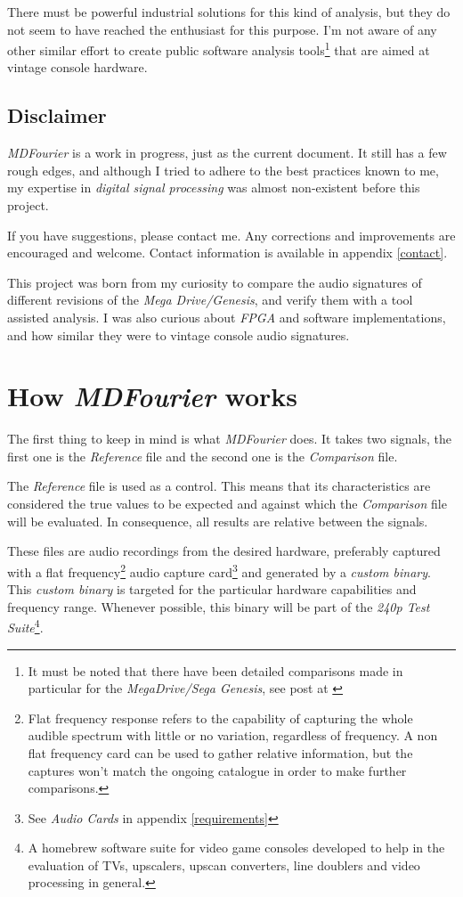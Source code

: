 \documentclass[10pt,a4paper]{report}
\begin{document}
There must be powerful industrial solutions for this kind of analysis, but they do not seem to have reached the enthusiast for this purpose. I'm not aware of any other similar effort to create public software analysis tools\footnote{It must be noted that there have been detailed comparisons made in particular for the \textit{MegaDrive/Sega Genesis}, see post at \cite{genesisaudio}} that are aimed at vintage console hardware. 

\newpage
\section{Disclaimer}

\textit{MDFourier} is a work in progress, just as the current document. It still has a few rough edges, and although I tried to adhere to the best practices known to me, my expertise in \textit{digital signal processing} was almost non-existent before this project. 

If you have suggestions, please contact me. Any corrections and improvements are encouraged and welcome. Contact information is available in appendix \ref{contact}.

This project was born from my curiosity to compare the audio signatures of different revisions of the  \textit{Mega Drive/Genesis}, and verify them with a tool assisted analysis. I was also curious about \textit{FPGA} and software implementations, and how similar they were to vintage console audio signatures.

\chapter{How \textit{MDFourier} works}
\label{howitworks}

The first thing to keep in mind is what \textit{MDFourier} does. It takes two signals, the first one is the \textit{Reference} file and the second one is the \textit{Comparison} file.

The \textit{Reference} file is used as a control. This means that its characteristics are considered the true values to be expected and against which the \textit{Comparison} file will be evaluated. In consequence, all results are relative between the signals.

These files are audio recordings from the desired hardware, preferably captured with a flat frequency\footnote{Flat frequency response refers to the capability of capturing the whole audible spectrum with little or no variation, regardless of frequency. A non flat frequency card can be used to gather relative information, but the captures won't match the ongoing catalogue in order to make further comparisons.} audio capture card\footnote{See \textit{Audio Cards} in appendix \ref{requirements}} and generated by a \textit{custom binary}. This \textit{custom binary} is targeted for the particular hardware capabilities and frequency range. Whenever possible, this binary will be part of the \textit{240p Test Suite}\footnote{A homebrew software suite for video game consoles developed to help in the evaluation of TVs, upscalers, upscan converters, line doublers and video processing in general.\cite{240pSuite}}. 
\end{document}
